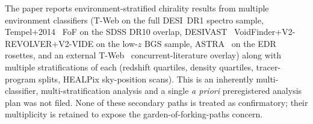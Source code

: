 \documentclass[twocolumn,linenumbers]{aastex702}
\begin{document}
\iffalse
The paper reports environment-stratified chirality results from
multiple environment classifiers (T-Web on the full DESI~DR1 spectro
sample, Tempel+2014~\cite{Tempel2014} FoF on the SDSS DR10 overlap,
DESIVAST~\cite{DESIVAST2025} VoidFinder+V2-REVOLVER+V2-VIDE on the
low-$z$ BGS sample, ASTRA~\cite{ASTRADESI2026} on the EDR rosettes,
and an external T-Web~\cite{TWebDESI2026} concurrent-literature
overlay) along with multiple stratifications of each
(redshift quartiles, density quartiles, tracer-program splits,
HEALPix sky-position scans). This is an inherently multi-classifier,
multi-stratification analysis and a single \emph{a priori} preregistered
analysis plan was not filed. None of these secondary paths is treated as
confirmatory; their multiplicity is retained to expose the
garden-of-forking-paths concern.
\end{document}
